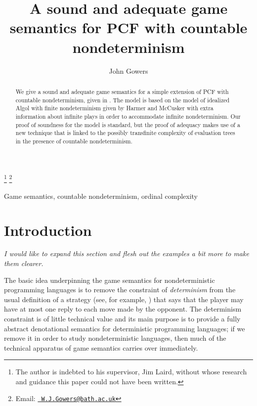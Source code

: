 \documentclass{entcs} \usepackage{prentcsmacro}
\newcommand{\0}{{\mathtt{0}}}
\begin{document}
\begin{frontmatter}
  \title{A sound and adequate game semantics for PCF with countable nondeterminism} \author{John
    Gowers}
  \address{Department of Computer Science \\ University of Bath \\
    Bath, United Kingdom} \thanks[ALL]{The author is indebted to
    his supervisor, Jim Laird, without whose research and guidance
    this paper could not have been written.} \thanks[myemail]{Email:
    \href{mailto:wjg27@bath.ac.uk} {\texttt{\normalshape
        W.J.Gowers@bath.ac.uk}}} 
\begin{abstract} 
  We give a sound and adequate game semantics for a simple extension of PCF with countable nondeterminism, given in \cite{LairdOrdinalGames}.  The model is based on the model of idealized Algol with finite nondeterminism given by Harmer and McCusker \cite{mccHFiniteND} with extra information about infinite plays in order to accommodate infinite nondeterminism.  Our proof of soundness for the model is standard, but the proof of adequacy makes use of a new technique that is linked to the possibly transfinite complexity of evaluation trees in the presence of countable nondeterminism.
\end{abstract}
\begin{keyword}
  Game semantics, countable nondeterminism, ordinal complexity
\end{keyword}
\end{frontmatter}

\section{Introduction}

{\it I would like to expand this section and flesh out the examples a bit more to make them clearer.}

The basic idea underpinning the game semantics for nondeterministic programming languages is to remove the constraint of \emph{determinism} from the usual definition of a strategy (see, for example, \cite{abramskyjagadeesangames}) that says that the player may have at most one reply to each move made by the opponent.  The determinism constraint is of little technical value and its main purpose is to provide a fully abstract denotational semantics for deterministic programming languages; if we remove it in order to study nondeterministic languages, then much of the technical apparatus of game semantics carries over immediately.  
\end{document}
